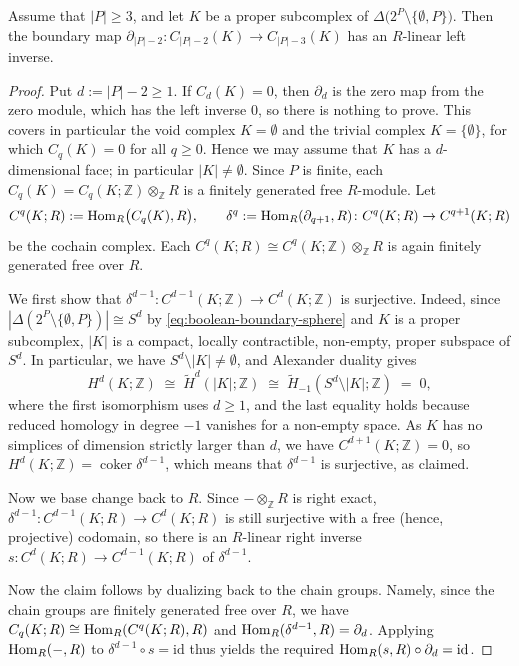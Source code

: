 \documentclass[a4paper,leqno]{amsart}
\begin{document}
\begin{lem}\label{lem:split-boundary-subset-chains}
Assume that $|P|\geq3$, and let $K$ be a proper subcomplex of
$\Delta\bigl(2^P\setminus\{\emptyset,P\}\bigr)$. Then the boundary map
$\partial_{|P|-2}:C_{|P|-2}(K)\longrightarrow C_{|P|-3}(K)$ has an $R$-linear left inverse. 
\end{lem}
\begin{proof}
Put $d:=|P|-2\ge 1$.
If $C_d(K)=0$, then $\partial_d$ is the zero map from the zero module, which has the left inverse $0$, so there is nothing to prove. This covers in particular the void complex $K=\emptyset$ and the trivial complex $K=\{\emptyset\}$, for which $C_q(K)=0$ for all $q\geq0$. Hence we may assume that $K$ has a $d$-dimensional face; in particular $|K|\neq\emptyset$.
Since $P$ is finite, each $C_q(K)=C_q(K;\mathbb Z)\otimes_{\mathbb Z}R$ is a finitely generated free $R$-module. 
Let
\[
  C^q(K;R):=\operatorname{Hom}_R\bigl(C_q(K),R\bigr),\qquad
  \delta^q:=\operatorname{Hom}_R(\partial_{q+1},R)\colon C^q(K;R)\to C^{q+1}(K;R)
\]
be the cochain complex.
Each $C^q(K;R)\cong C^q(K;\mathbb Z)\otimes_{\mathbb Z}R$ is again finitely generated free over $R$.

We first show that $\delta^{d-1}\colon C^{d-1}(K;\mathbb Z)\to C^{d}(K;\mathbb Z)$ is surjective.
Indeed, since $|\Delta(2^P\setminus\{\emptyset,P\})|\cong S^{d}$ by \eqref{eq:boolean-boundary-sphere} and $K$ is a
proper subcomplex, $|K|$ is a compact, locally contractible, non-empty, proper subspace of $S^d$.
In particular, we have $S^d\setminus|K|\neq\emptyset$, and Alexander duality \cite[Cor.~3.45]{Hat02} gives
\[
  H^{d}(K;\mathbb Z)\;\cong\;\widetilde H^{d}(|K|;\mathbb Z)\;\cong\;\widetilde H_{-1}(S^d\setminus|K|;\mathbb Z)\;=\;0,
\]
where the first isomorphism uses $d\ge1$, and the last equality holds because reduced homology in degree $-1$ vanishes for a non-empty space.
As $K$ has no simplices of dimension strictly larger than $d$, we have $C^{d+1}(K;\mathbb Z)=0$, so $H^d(K;\mathbb Z)=\operatorname{coker}\delta^{d-1}$, which means that $\delta^{d-1}$ is surjective, as claimed.

Now we base change back to $R$.
Since $-\otimes_{\mathbb Z}R$ is right exact, $\delta^{d-1}\colon C^{d-1}(K;R)\to C^d(K;R)$ is still surjective with a free (hence, projective) codomain, so there is an $R$-linear right inverse $s: C^d(K;R)\to C^{d-1}(K;R)$ of $\delta^{d-1}$.

Now the claim follows by dualizing back to the chain groups.
Namely, since the chain groups are finitely generated free over $R$, we have $C_q(K;R)\cong \operatorname{Hom}_R(C^q(K;R),R)$ and $\operatorname{Hom}_R(\delta^{d-1},R)=\partial_{d}$.  Applying $\operatorname{Hom}_R(-,R)$ to $\delta^{d-1}\circ s=\mathrm{id}$ thus yields the required 
$\operatorname{Hom}_R(s,R)\circ\partial_d=\mathrm{id}$.
\end{proof}
\end{document}
